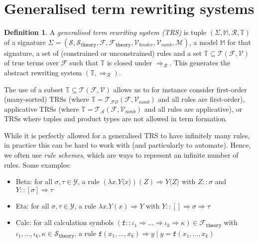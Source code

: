 \documentclass{lmcs}
\theoremstyle{theorem}\newtheorem{theorem}{Theorem}
\theoremstyle{theorem}\newtheorem{lemma}[theorem]{Lemma}
\theoremstyle{theorem}\newtheorem{corollary}[theorem]{Corollary}
\theoremstyle{definition}\newtheorem{definition}[theorem]{Definition}
\theoremstyle{definition}\newtheorem{example}[theorem]{Example}
\newcommand{\F}{\mathcal{F}}
\newcommand{\thF}{\mathcal{F}_{\mathtt{theory}}}
\newcommand{\V}{\mathcal{V}}
\newcommand{\M}{\mathcal{M}}
\newcommand{\MM}{\mathbb{M}}
\newcommand{\Vfree}{\mathcal{V}_{\mathit{nonb}}}
\newcommand{\Vbound}{\mathcal{V}_{\mathit{binder}}}
\newcommand{\Sorts}{\mathcal{S}}
\newcommand{\thSorts}{\mathcal{S}_{\mathtt{theory}}}
\newcommand{\Types}{\mathcal{Y}}
\newcommand{\Terms}{\mathcal{T}}
\newcommand{\ATerms}{\mathcal{T}_{\mathcal{A}}}
\newcommand{\FOTerms}{\mathcal{T}_{\mathcal{FO}}}
\newcommand{\Rules}{\mathcal{R}}
\newcommand{\termsset}{\mathbb{T}}
\newcommand{\asort}{\iota}
\newcommand{\bsort}{\kappa}
\newcommand{\atype}{\sigma}
\newcommand{\btype}{\tau}
\newcommand{\identifier}[1]{\mathtt{#1}}
\newcommand{\afun}{\identifier{f}}
\newcommand{\avar}{x}
\newcommand{\bvar}{y}
\newcommand{\Bvar}{Y}
\newcommand{\Cvar}{Z}
\newcommand{\abs}[2]{\lambda #1.#2}
\newcommand{\meta}[2]{#1\langle#2\rangle}
\newcommand{\tuple}[2]{\llparenthesis #1,\dots,#2 \rrparenthesis}
\newcommand{\arrtype}{\Rightarrow}
\newcommand{\arrz}{\Rightarrow}
\newcommand{\arr}[1]{\arrz_{#1}}
\begin{document}
\section{Generalised term rewriting systems}\label{sec:trs}

\begin{definition}
A \emph{generalised term rewriting system (TRS)} is tuple $(\Sigma,\MM,\Rules,
\termsset)$ of a signature $\Sigma = (\Sorts,\thSorts,\F,\thF,\Vbound,\Vfree,
\M)$, a model $\MM$ for that signature, a set of (constrained or unconstrained)
rules and a set $\termsset \subseteq \Terms(\F,\V)$ of true terms over $\F$
such that $\termsset$ is closed under $\arr{\Rules}$.
This generates the abstract rewriting system $(\termsset,\arr{\Rules})$.
\end{definition}

The use of a subset $\termsset \subseteq \Terms(\F,\V)$ allows us to for
instance consider first-order (many-sorted) TRSs (where $\termsset =
\FOTerms(\F,\Vfree)$ and all rules are first-order), applicative TRSs (where
$\termsset = \ATerms(\F,\Vfree)$ and all rules are applicative), or TRSs where
tuples and product types are not allowed in term formation.

While it is perfectly allowed for a generalised TRS to have infinitely many
rules, in practice this can be hard to work with (and particularly to automate).
Hence, we often use \emph{rule schemes}, which are ways to represent an infinite
number of rules.  Some examples:
\begin{itemize}
\item Beta: for all $\atype,\btype \in \Types$,
  a rule $(\abs{\avar}{\meta{\Bvar}{\avar}})(\Cvar) \arrz \meta{\Bvar}{\Cvar}$
  with $\Cvar :: \atype$ and $\Bvar :: [\atype] \arrtype \btype$
\item Eta: for all $\atype,\btype \in \Types$,
  a rule $\abs{\avar}{\Bvar(\avar)} \arrz \Bvar$
  with $\Bvar :: [] \arrtype \atype \arrtype \btype$
\item Calc: for all calculation symbols $(\afun :: \asort_1 \arrtype \dots
  \arrtype \asort_k \arrtype \bsort) \in  \thF$ with $\asort_1,\dots,\asort_k,
  \bsort \in \thSorts$, a rule $\afun(\avar_1,\dots,\avar_k) \arrz \bvar \mid
  \bvar = \afun(\avar_1,\dots,\avar_k)$
\end{itemize}
\end{document}
